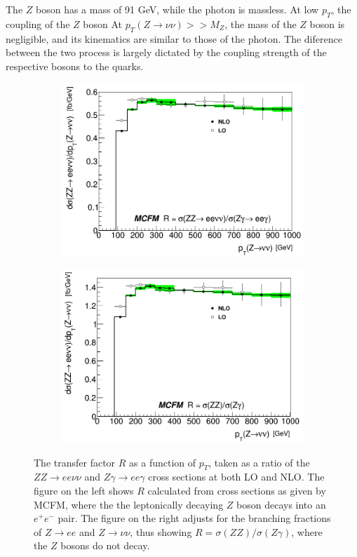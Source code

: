 \documentclass[11pt,a4paper,openright,twoside]{report}
\begin{document}
The $Z$ boson has a mass of 91 GeV, while the photon is massless. At low $p_T$, the coupling of the $Z$ boson At $p_T(Z\to\nu\nu) >> M_Z$, the mass of the $Z$ boson is negligible, and its kinematics are similar to those of the photon. The diference between the two process is largely dictated by the coupling strength of the respective bosons to the quarks. 
\begin{figure}[H]
\centering
	\begin{subfigure}{0.49\textwidth}
		\includegraphics[width=\linewidth]{R.png}
		\caption{}
		\label{fig:Rcurve}
	\end{subfigure}
	\begin{subfigure}{0.49\textwidth}
		\includegraphics[width=\linewidth]{R_BR.png}
		\caption{}
		\label{fig:RcurveBR}
	\end{subfigure}
	\caption{The transfer factor $R$ as a function of $p_T$, taken as a ratio of  the $ZZ\to ee\nu\nu$ and $Z\gamma\to ee\gamma$ cross sections at both LO and NLO. The figure on the left shows $R$ calculated from cross sections as given by MCFM, where the the leptonically decaying $Z$ boson decays into an $e^+e^-$ pair. The figure on the right adjusts for the branching fractions of $Z\to ee$ and $Z\to\nu\nu$, thus showing $R = \sigma(ZZ)/\sigma(Z\gamma)$, where the $Z$ bosons do not decay.}
\end{figure}
\end{document}

